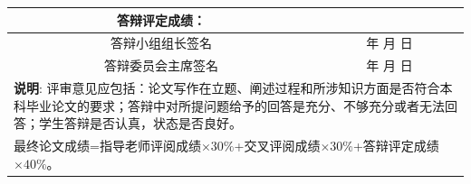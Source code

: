 {\begin{tabular}{|p{.3cm}|p{2.2cm}|p{5cm}|p{1cm}|p{4cm}|}
		\multicolumn{2}{|c}{{答辩评定成绩：}}    &  \multicolumn{3}{l|}{{\dabiancj}}                \\\hline
		\multicolumn{2}{|c}{答辩小组组长签名}    & \multicolumn{3}{|c|}{\hspace{4cm}\nian\hspace{.2cm}年\hspace{.5cm} 月\hspace{.5cm} 日} \\\hline
		\multicolumn{2}{|c}{答辩委员会主席签名}  & \multicolumn{3}{|c|}{\hspace{4cm}\nian\hspace{.2cm}年\hspace{.5cm} 月\hspace{.5cm} 日} \\\hline
		\multicolumn{5}{p{14.8cm}}{{\textbf{说明}}: 评审意见应包括：论文写作在立题、阐述过程和所涉知识方面是否符合本科毕业论文的要求；答辩中对所提问题给予的回答是充分、不够充分或者无法回答；学生答辩是否认真，状态是否良好。}\\
		\multicolumn{5}{p{14.8cm}}{最终论文成绩=指导老师评阅成绩$\times 30\%$+交叉评阅成绩$\times 30\%$+答辩评定成绩$\times 40\%$。}
	\end{tabular}%
}

